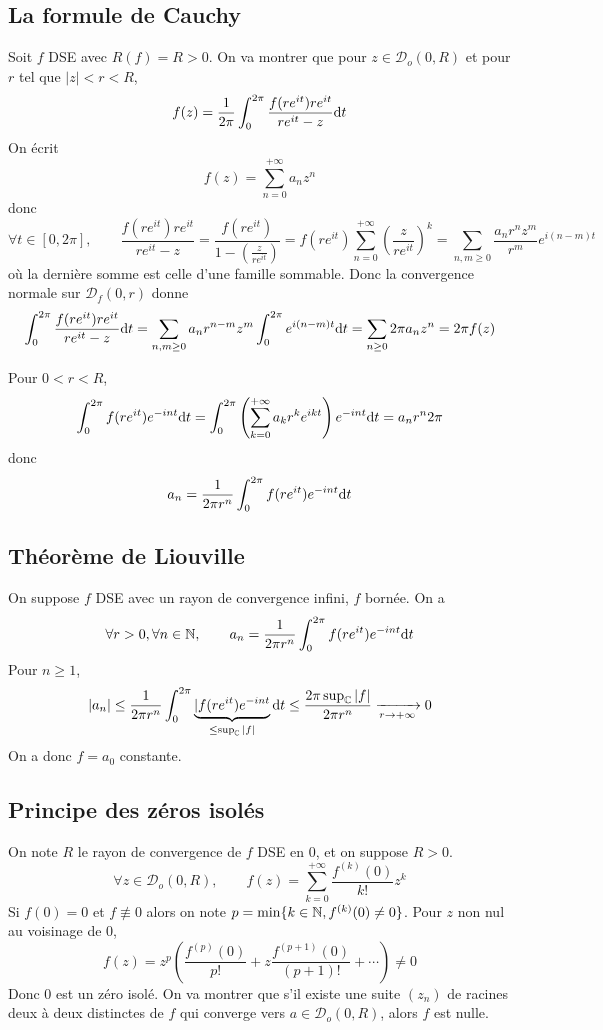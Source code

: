 \subsection{La formule de Cauchy}

Soit $f$ DSE avec $R(f)=R>0$. On va montrer que pour $z \in \mathcal{D}_o(0, R)$ et pour $r$ tel que $|z|<r<R$, \[
    f(z)=\frac{1}{2\pi}\int_{0}^{2\pi} \frac{f(re^{it})re^{it}}{re^{it}-z}\mathrm{d} t
\]
On écrit \[
    f(z)=\sum_{n=0}^{+\infty} a_n z^n
\]
donc\[
    \forall t\in [0, 2\pi],  \qquad \frac{f(re^{it})re^{it}}{re^{it}-z}=\frac{f(re^{it})}{1- \left( \frac{z}{re^{it}} \right) } = f(re^{it}) \sum_{n=0}^{+\infty} \left( \frac{z}{re^{it}} \right)^k=\sum_{n,m\geq 0} \frac{a_nr^nz^m}{r^m}e^{i(n-m)t}
\]
où la dernière somme est celle d'une famille sommable. Donc la convergence normale sur $\mathcal{D}_f(0,r)$ donne \[
    \int_{0}^{2\pi} \frac{f(re^{it})re^{it}}{re^{it}-z}\mathrm{d} t= \sum_{n,m\geq 0}a_nr^{n-m}z^m \int_{0}^{2\pi} e^{i(n-m)t}\mathrm{d} t=\sum_{n\geq 0}2\pi a_nz^n=2\pi f(z)
\]

\begin{rem}
    Pour $0<r<R$, \[
        \int_{0}^{2\pi } f(re^{it})e^{-i nt}\mathrm{d} t = \int_{0}^{2\pi } \left( \sum_{k=0}^{+\infty} a_kr^ke^{ikt} \right) e^{-int}\mathrm{d} t=a_nr^{n}2\pi 
    \]
    donc \[
        a_n=\frac{1}{2\pi r^n}\int_{0}^{2\pi } f(re^{it})e^{-int}\mathrm{d} t 
    \]
\end{rem}

\subsection{Théorème de Liouville}

On suppose $f$ DSE avec un rayon de convergence infini, $f$ bornée. On a \[
    \forall r>0, \forall n\in\mathbb N, \qquad a_n=\frac{1}{2\pi r^n}\int_{0}^{2\pi }f(re^{it}) e^{-int}\mathrm{d} t
\]
Pour $n\geq 1$, \[
    |a_n|\leq \frac{1}{2\pi r^n}\int_{0}^{2\pi } \underbrace{|f(re^{it})e^{-int}}_{\leq \sup_{\mathbb C}|f|}\mathrm{d} t\leq \frac{2\pi \sup_{\mathbb C}|f|}{2\pi r^n} \xrightarrow[r\to+\infty]{}0
\]
On a donc $f=a_0$ constante.


\subsection{Principe des zéros isolés}

On note $R$ le rayon de convergence de $f$ DSE en $0$, et on suppose $R>0$. \[
    \forall z \in \mathcal{D}_o(0,R),\qquad f(z)=\sum_{k=0}^{+\infty} \frac{f^{(k)}(0)}{k!}z^k
\]
Si $f(0)=0$ et $f\not\equiv 0$ alors on note $p=\min \{k\in\mathbb N, f^{(k)}(0)\neq 0\}$. Pour $z$ non nul au voisinage de $0$, \[
    f(z)=z^p \left( \frac{f^{(p)}(0)}{p!}+ z \frac{f^{(p+1)}(0)}{(p+1)!}+\cdots \right) \neq 0
\]
Donc $0$ est un zéro isolé. On va montrer que s'il existe une suite $(z_n)$ de racines deux à deux distinctes de $f$ qui converge vers $a\in\mathcal D_o(0,R)$, alors $f$ est nulle.


